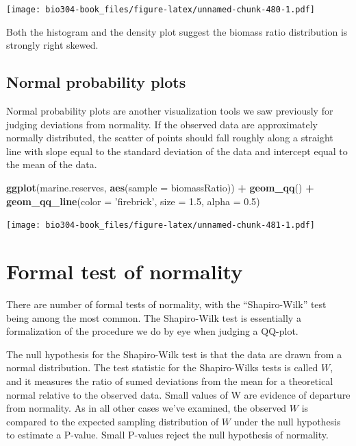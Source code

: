 \documentclass[]{book}
\newenvironment{Shaded}{\begin{snugshade}}{\end{snugshade}}
\newcommand{\DataTypeTok}[1]{\textcolor[rgb]{0.13,0.29,0.53}{#1}}
\newcommand{\FloatTok}[1]{\textcolor[rgb]{0.00,0.00,0.81}{#1}}
\newcommand{\KeywordTok}[1]{\textcolor[rgb]{0.13,0.29,0.53}{\textbf{#1}}}
\newcommand{\NormalTok}[1]{#1}
\newcommand{\OperatorTok}[1]{\textcolor[rgb]{0.81,0.36,0.00}{\textbf{#1}}}
\newcommand{\StringTok}[1]{\textcolor[rgb]{0.31,0.60,0.02}{#1}}
\theoremstyle{definition}
\theoremstyle{definition}
\theoremstyle{definition}
\theoremstyle{remark}
\begin{document}
\texttt{[image: bio304-book\_files/figure-latex/unnamed-chunk-480-1.pdf]}

Both the histogram and the density plot suggest the biomass ratio
distribution is strongly right skewed.

\hypertarget{normal-probability-plots}{%
\subsection*{Normal probability plots}\label{normal-probability-plots}}

Normal probability plots are another visualization tools we saw
previously for judging deviations from normality. If the observed data
are approximately normally distributed, the scatter of points should
fall roughly along a straight line with slope equal to the standard
deviation of the data and intercept equal to the mean of the data.

\begin{Shaded}
\begin{Highlighting}[]
\KeywordTok{ggplot}\NormalTok{(marine.reserves, }\KeywordTok{aes}\NormalTok{(}\DataTypeTok{sample =}\NormalTok{ biomassRatio)) }\OperatorTok{+}\StringTok{ }
\StringTok{  }\KeywordTok{geom_qq}\NormalTok{() }\OperatorTok{+}\StringTok{ }
\StringTok{  }\KeywordTok{geom_qq_line}\NormalTok{(}\DataTypeTok{color =} \StringTok{'firebrick'}\NormalTok{, }\DataTypeTok{size =} \FloatTok{1.5}\NormalTok{, }\DataTypeTok{alpha =} \FloatTok{0.5}\NormalTok{)}
\end{Highlighting}
\end{Shaded}

\texttt{[image: bio304-book\_files/figure-latex/unnamed-chunk-481-1.pdf]}

\hypertarget{formal-test-of-normality}{%
\section{Formal test of normality}\label{formal-test-of-normality}}

There are number of formal tests of normality, with the ``Shapiro-Wilk''
test being among the most common. The Shapiro-Wilk test is essentially a
formalization of the procedure we do by eye when judging a QQ-plot.

The null hypothesis for the Shapiro-Wilk test is that the data are drawn
from a normal distribution. The test statistic for the Shapiro-Wilks
tests is called \(W\), and it measures the ratio of sumed deviations
from the mean for a theoretical normal relative to the observed data.
Small values of W are evidence of departure from normality. As in all
other cases we've examined, the observed \(W\) is compared to the
expected sampling distribution of \(W\) under the null hypothesis to
estimate a P-value. Small P-values reject the null hypothesis of
normality.
\end{document}
